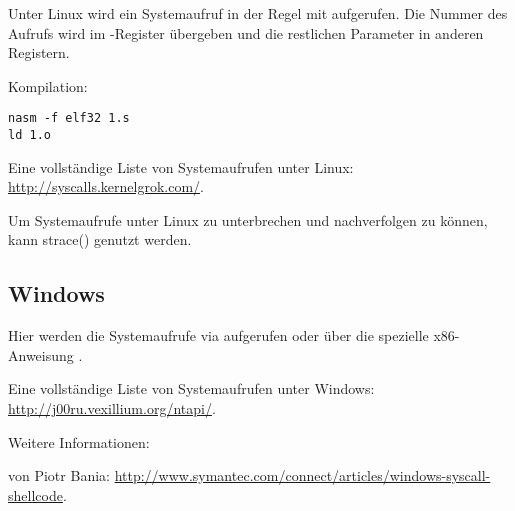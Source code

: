 Unter Linux wird ein Systemaufruf in der Regel mit  aufgerufen.
Die Nummer des Aufrufs wird im \EAX-Register übergeben und die restlichen Parameter in anderen Registern.

%


Kompilation:

\begin{lstlisting}
nasm -f elf32 1.s
ld 1.o
\end{lstlisting}

Eine vollständige Liste von Systemaufrufen unter Linux: \url{http://syscalls.kernelgrok.com/}.

Um Systemaufrufe unter Linux zu unterbrechen und nachverfolgen zu können, kann strace()
genutzt werden.

\subsection{Windows}


Hier werden die Systemaufrufe via  aufgerufen oder über die spezielle x86-Anweisung .

Eine vollständige Liste von Systemaufrufen unter Windows: \url{http://j00ru.vexillium.org/ntapi/}.

Weitere Informationen:

 von Piotr Bania: \url{http://www.symantec.com/connect/articles/windows-syscall-shellcode}.
